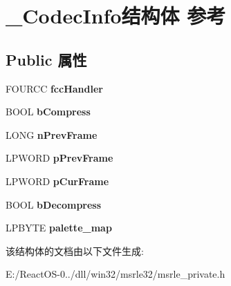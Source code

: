 \hypertarget{struct___codec_info}{}\section{\+\_\+\+Codec\+Info结构体 参考}
\label{struct___codec_info}
\subsection*{Public 属性}
\begin{DoxyCompactItemize}
\item 
\mbox{\label{struct___codec_info_ad18e6f479437e42ba5383dab7f1725cd}} 
F\+O\+U\+R\+CC {\bfseries fcc\+Handler}
\item 
\mbox{\label{struct___codec_info_a3b86e2d91e97cfe5cd5937c272c1fd8d}} 
B\+O\+OL {\bfseries b\+Compress}
\item 
\mbox{\label{struct___codec_info_a1ed53c06a7c24f8b490daf0254aa78c5}} 
L\+O\+NG {\bfseries n\+Prev\+Frame}
\item 
\mbox{\label{struct___codec_info_a56113ea4cd4a7e23a07dfbcb046f4659}} 
L\+P\+W\+O\+RD {\bfseries p\+Prev\+Frame}
\item 
\mbox{\label{struct___codec_info_a532f037f798eb3d1410a84ced76bd480}} 
L\+P\+W\+O\+RD {\bfseries p\+Cur\+Frame}
\item 
\mbox{\label{struct___codec_info_ac0e9c4dfdff8e6fcf7b625925f14633d}} 
B\+O\+OL {\bfseries b\+Decompress}
\item 
\mbox{\label{struct___codec_info_a1b44aca0eab934308d336107b5dc3422}} 
L\+P\+B\+Y\+TE {\bfseries palette\+\_\+map}
\end{DoxyCompactItemize}


该结构体的文档由以下文件生成\+:\begin{DoxyCompactItemize}
\item 
E\+:/\+React\+O\+S-\/0../dll/win32/msrle32/msrle\+\_\+private.\+h\end{DoxyCompactItemize}
